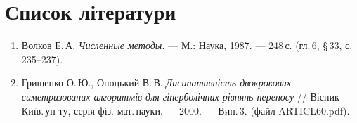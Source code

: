 \documentclass[12pt,a4paper]{article}
\begin{document}
\section*{Список літератури}

\begin{enumerate}
  \item Волков Е.\,А. \emph{Численные методы.} --- М.: Наука, 1987. --- 248\,с. (гл.\,6, \S\,33, с.\,235--237).
  \item Грищенко О.\,Ю., Оноцький В.\,В. \emph{Дисипативність двокрокових симетризованих алгоритмів для гіперболічних рівнянь переносу} // Вісник Київ.\,ун-ту, серія фіз.-мат.\,науки. --- 2000. --- Вип.\,3. (файл ARTICL60.pdf).
\end{enumerate}
\end{document}
